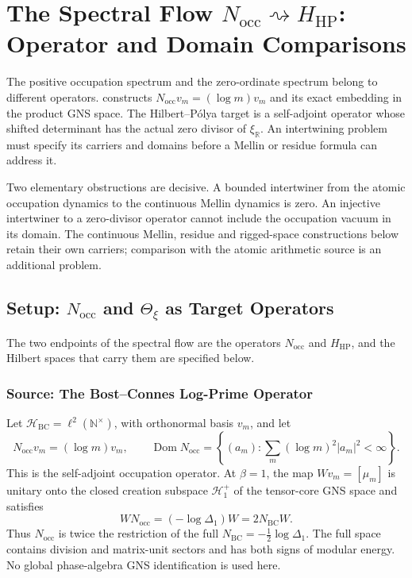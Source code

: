 \chapter{The Spectral Flow \(N_{\mathrm{occ}}\rightsquigarrow H_{\mathrm{HP}}\): Operator and Domain Comparisons}
\label{v4-arith:w9-r4:hpar-spectral-flow}

The positive occupation spectrum and the zero-ordinate spectrum belong
to different operators. 
constructs \(N_{\mathrm{occ}}v_m=(\log m)v_m\) and its exact embedding
in the product GNS space. The Hilbert--P\'olya target is a self-adjoint
operator whose shifted determinant has the actual zero divisor of
\(\xi_{\mathbb R}\). An intertwining problem must specify its carriers
and domains before a Mellin or residue formula can address it.

Two elementary obstructions are decisive. A bounded intertwiner from
the atomic occupation dynamics to the continuous Mellin dynamics is
zero. An injective intertwiner to a zero-divisor operator cannot
include the occupation vacuum in its domain. The continuous Mellin,
residue and rigged-space constructions below retain their own carriers;
comparison with the atomic arithmetic source is an additional problem.

\section{Setup: \(N_{\mathrm{occ}}\) and \(\Theta_{\xi}\) as Target Operators}
\label{v4-arith:w9-r4:setup}

The two endpoints of the spectral flow are the operators \(N_{\mathrm{occ}}\) and
\(H_{\mathrm{HP}}\), and the Hilbert spaces that carry them are specified below.

\subsection{Source: The Bost--Connes Log-Prime Operator}
\label{v4-arith:w9-r4:setup:source}

\begin{definition}
\label{v4-arith:w9-r4:def:bc-data}
Let \(\mathcal H_{\mathrm{BC}}=\ell^2(\mathbb N^\times)\), with
orthonormal basis \(v_m\), and let
\[
 N_{\mathrm{occ}}v_m=(\log m)v_m,\qquad
 \operatorname{Dom}N_{\mathrm{occ}}=
 \left\{(a_m):\sum_m(\log m)^2|a_m|^2<\infty\right\}.
\]
This is the self-adjoint occupation operator. At \(\beta=1\), the map
\(Wv_m=[\mu_m]\) is unitary onto the closed creation subspace
\(\mathcal H_1^+\) of the tensor-core GNS space and satisfies
\[
 WN_{\mathrm{occ}}=(-\log\Delta_1)W=2N_{\mathrm{BC}}W.
\]
Thus \(N_{\mathrm{occ}}\) is twice the restriction of the full
\(N_{\mathrm{BC}}=-\tfrac12\log\Delta_1\). The full space contains
division and matrix-unit sectors and has both signs of modular energy.
No global phase-algebra GNS identification is used here.
\end{definition}

